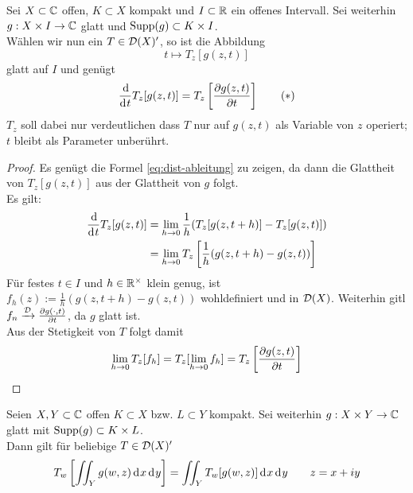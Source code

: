 \begin{lemma}
  \label{lemma:dist-glatt}
  Sei $X \subset \mathbb{C}$ offen, $K \subset X$ kompakt und $I \subset \mathbb{R}$ ein
  offenes Intervall. Sei weiterhin $g: X \times I \rightarrow \mathbb{C}$ glatt und
  $\operatorname{Supp}(g) \subset K \times I$. \\
  Wählen wir nun ein $T \in \mathcal{D}(X)'$, so ist die Abbildung
  \[
  t \mapsto T_z[g(z,t)]
  \]
  glatt auf $I$ und genügt
  \[
  \frac{\d}{\d[t]} T_z[g(z,t)] = T_z \left [ \frac{\partial
      g(z,t)}{\partial t} \right ] \tag{$\ast$} \label{eq:dist-ableitung}
  \]
  $T_z$ soll dabei nur verdeutlichen dass $T$ nur auf $g(z,t)$ als
  Variable von $z$ operiert; $t$ bleibt als Parameter unberührt.
\end{lemma}

\begin{proof}
  Es genügt die Formel \eqref{eq:dist-ableitung} zu zeigen, da dann
  die Glattheit von $T_z[g(z,t)]$ aus der Glattheit von $g$ folgt. \\
  Es gilt:
  \begin{align*}
    \frac{\d}{\d[t]} T_z[g(z,t)] & = \lim_{h \ra 0} \frac1h (
    T_z[g(z,t+h)] - T_z[g(z,t)] ) \\
    & = \lim_{h \ra 0} T_z \left [ \frac1h (g(z,t+h) - g(z,t)) \right ]
  \end{align*}
  Für festes $t \in I$ und $h \in \mathbb{R}^\times$ klein genug, ist $f_h(z)
  := \frac1h ( g(z, t+h) - g(z,t))$ wohldefiniert und in
  $\mathcal{D}(X)$. Weiterhin gitl $f_n \xrightarrow{\mathcal{D}}
  \frac{\partial g(\cdot, t)}{\partial t}$, da $g$ glatt ist. \\
  Aus der Stetigkeit von $T$ folgt damit
  \[
  \lim_{h\rightarrow 0} T_z[f_h] = T_z[\lim_{h \rightarrow 0} f_h] = T_z\left[
    \frac{\partial g(z,t)}{\partial t} \right]
  \]
\end{proof}

\begin{lemma}
  \label{lemma:dist-int}
  Seien $X,Y \subset \mathbb{C}$ offen $K \subset X$ bzw. $L \subset Y$
  kompakt. Sei weiterhin $g: X \times Y \rightarrow \mathbb{C}$ glatt mit $\operatorname{Supp}(g)
  \subset K \times L$. \\
  Dann gilt für beliebige $T \in \mathcal{D}(X)'$
  \[
  T_w\left [ \iint_Y g(w,z) \d[x]\d[y] \right ] = \iint_Y T_w [
  g(w,z)] \d[x]\d[y] \qquad z = x + iy
  \]
\end{lemma}

